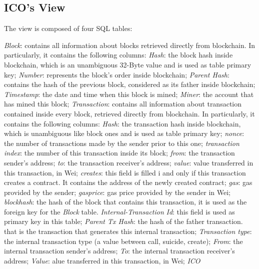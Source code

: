 \subsection{ICO's View}
The view is composed of four SQL tables: 
\begin{outline}
    \1 \textit{Block}: contains all information about blocks retrieved directly from blockchain. In particularly, it contains the following columns:
        \2 \textit{Hash}: the block hash inside blockchain, which is an unambiguous 32-Byte value and is used as table primary key;
        \2 \textit{Number}: represents the block's order inside blockchain;
        \2 \textit{Parent Hash}: contains the hash of the previous block, considered as its father inside blockchain;
        \2 \textit{Timestamp}: the date and time when this block is mined;
        \2 \textit{Miner}: the account that has mined this block;
    \1 \textit{Transaction}: contains all information about transaction contained inside every block, retrieved directly from blockchain. In particularly, it contains the following columns:
        \2 \textit{Hash}: the transaction hash inside blockchain, which is unambiguous like block ones and is used as table primary key;
        \2 \textit{nonce}: the number of transactions made by the sender prior to this one;
        \2 \textit{transaction index}: the number of this transaction inside its block;
        \2 \textit{from}: the transaction sender's address;
        \2 \textit{to}: the transaction receiver's address;
        \2 \textit{value}: value transferred in this transaction, in Wei;
        \2 \textit{creates}: this field is filled i and only if this transaction creates a contract. It contains the address of the newly created contract;
        \2 \textit{gas}: gas provided by the sender;
        \2 \textit{gasprice}: gas price provided by the sender in Wei;
        \2 \textit{blockhash}: the hash of the block that contains this transaction, it is used as the foreign key for the \textit{Block} table.
    \1 \textit{Internal-Transaction}
        \2 \textit{Id}: this field is used as primary key in this table;
        \2 \textit{Parent Tx Hash}: the hash of the father transaction. that is the transaction that generates this internal transaction;
        \2 \textit{Transaction type}: the internal transaction type (a value between call, suicide, create);
        \2 \textit{From}: the internal transaction sender's address;
        \2 \textit{To}: the internal transaction receiver's address;
        \2 \textit{Value}: alue transferred in this transaction, in Wei;
    \1 \textit{ICO}

\end{outline}

